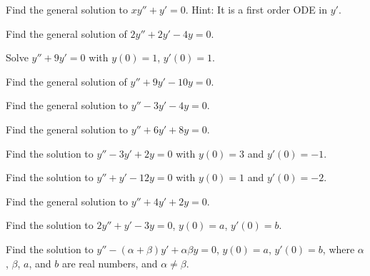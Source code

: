 \begin{exercise}\ansMark%
Find the general solution to
$x y'' + y' = 0$.  Hint: It is a first order ODE in $y'$.
\end{exercise}

\begin{exercise}
Find the general solution of $2y'' + 2y' -4 y = 0$.
\end{exercise}

\begin{exercise}
Solve $y'' + 9y' = 0$ with $y(0) = 1$, $y'(0) = 1$.
\end{exercise}

\begin{exercise}
Find the general solution of $y'' + 9y' - 10 y = 0$.
\end{exercise}

\begin{exercise}
Find the general solution to $y'' - 3y' - 4y = 0$.
\end{exercise}

\begin{exercise}
Find the general solution to $y'' + 6y' + 8y = 0$.
\end{exercise}

\begin{exercise}
Find the solution to $y'' - 3y' + 2y = 0$ with $y(0) = 3$ and $y'(0) = -1$.
\end{exercise}

\begin{exercise}
Find the solution to $y'' + y' -12y = 0$ with $y(0) = 1$ and $y'(0) = -2$.
\end{exercise}

\begin{exercise}\ansMark%
Find the general solution to
$y''+4y'+2y=0$.
\end{exercise}

\begin{exercise}\ansMark%
Find the solution to
$2y''+y'-3y=0$, $y(0) = a$, $y'(0)=b$.
\end{exercise}

\begin{exercise}\ansMark%
Find the solution to
$y''-(\alpha+\beta) y' + \alpha \beta y=0$, $y(0) = a$, $y'(0)=b$,
where $\alpha$, $\beta$, $a$, and $b$ are real numbers, and $\alpha \not=
\beta$.
\end{exercise}

